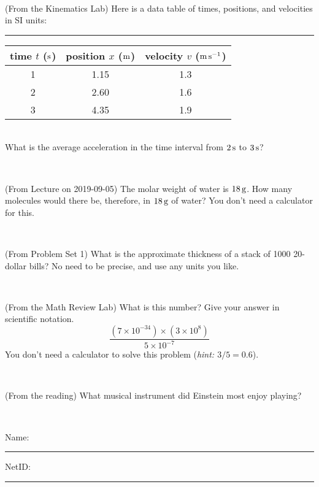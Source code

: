 \documentclass[12pt, letterpaper]{article}
\begin{document}
\vfill ~

\begin{problem} (From the Kinematics Lab)
Here is a data table of times, positions, and velocities in SI units:\\
\rule{1.0in}{0pt}\begin{tabular}{c|c|c}
time $t$ ($\mathrm{s}$) & position $x$ ($\mathrm{m}$) & velocity $v$ ($\mathrm{m}\,\mathrm{s}^{-1}$) \\
\hline
1 & 1.15 & 1.3 \\
2 & 2.60 & 1.6 \\
3 & 4.35 & 1.9 \\
\hline
\end{tabular}\\
What is the average acceleration in the time interval from $2\,\mathrm{s}$ to $3\,\mathrm{s}$?
\end{problem}


\vfill ~


\clearpage


\begin{problem} (From Lecture on 2019-09-05)
The molar weight of water is $18\,\mathrm{g}$. How many molecules would there
be, therefore, in $18\,\mathrm{g}$ of water? You don't need a calculator for
this.
\end{problem}


\vfill ~

\begin{problem} (From Problem Set 1)
What is the approximate thickness of a stack of 1000 20-dollar bills?
No need to be precise, and use any units you like.
\end{problem}


\vfill ~

\begin{problem} (From the Math Review Lab)
What is this number? Give your answer in scientific notation.
$$
\frac{(7\times10^{-34})\times(3\times10^8)}{5\times10^{-7}}
$$
You don't need a calculator to solve this problem (\textit{hint: $3/5=0.6$}).
\end{problem}


\vfill ~

\begin{problem} (From the reading)
What musical instrument did Einstein most enjoy playing?
\end{problem}


\vfill ~


\cleardoublepage



\noindent
Name: \rule[-1ex]{0.60\textwidth}{0.1pt}
NetID: \rule[-1ex]{0.20\textwidth}{0.1pt}
\end{document}
